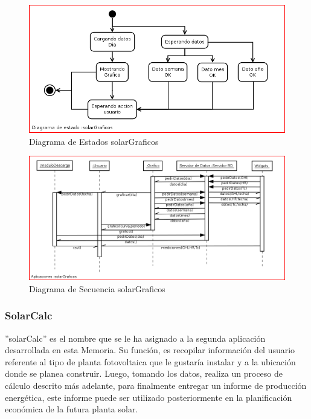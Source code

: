 \newpage
\begin{figure}[h!]
        \centering
        \includegraphics[scale=0.5]{images/graficosEstados}
        \caption{Diagrama de Estados solarGraficos}
        \label{solarGraficoE}
\end{figure}

\begin{figure}[h!]
        \centering
        \includegraphics[scale=0.35]{images/graficosSecuencia}
        \caption{Diagrama de Secuencia solarGraficos}
        \label{solarGraficoS}
\end{figure}

\newpage
\subsubsection{SolarCalc}
''solarCalc'' es el nombre que se le ha asignado a la segunda aplicación desarrollada en esta Memoria. Su función, es recopilar información del usuario referente al tipo de planta fotovoltaica que le gustaría instalar y a la ubicación donde se planea construir. Luego, tomando los datos, realiza un proceso de cálculo descrito más adelante, para finalmente entregar un informe de producción energética, este informe puede ser utilizado posteriormente en la planificación económica de la futura planta solar.\\

